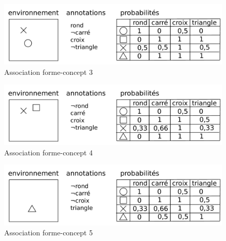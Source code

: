 \begin{figure}[H] 
\includegraphics[width=\textwidth]{files/raisonneur/annotations_3} 
\caption{Association forme-concept 3} 
\label{img_annotations_3}
\end{figure}

\begin{figure}[H] 
\includegraphics[width=\textwidth]{files/raisonneur/annotations_4} 
\caption{Association forme-concept 4} 
\label{img_annotations_4}
\end{figure}

\begin{figure}[H] 
\includegraphics[width=\textwidth]{files/raisonneur/annotations_5} 
\caption{Association forme-concept 5} 
\label{img_annotations_5}
\end{figure}

